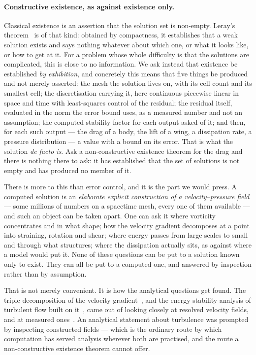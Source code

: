 \documentclass[11pt]{article}
\begin{document}
\paragraph{Constructive existence, as against existence only.} Classical existence is an assertion that the solution set is
non-empty. Leray's theorem~\cite{leray} is of that kind: obtained by compactness, it establishes that
a weak solution exists and says nothing whatever about which one, or what it looks like, or how to
get at it. For a problem whose whole difficulty is that the solutions are complicated, this is close
to no information. We ask instead that existence be established \emph{by exhibition}, and concretely this means that
five things be produced and not merely asserted: the mesh the solution lives on, with its cell count
and its smallest cell; the discretisation carrying it, here continuous piecewise linear in space and
time with least-squares control of the residual; the residual itself, evaluated in the norm the error
bound uses, as a measured number and not an assumption; the computed stability factor for each output
asked of it; and then, for each such output --- the drag of a body, the lift of a wing, a dissipation
rate, a pressure distribution --- a value with a bound on its error. That is what the solution
\emph{de facto is}. Ask a non-constructive existence theorem for the drag and there is nothing there
to ask: it has established that the set of solutions is not empty and has produced no member of it.

There is more to this than error control, and it is the part we would press. A computed solution is an
\emph{elaborate explicit construction of a velocity--pressure field} --- some millions of numbers on a
spacetime mesh, every one of them available --- and such an object can be taken apart. One can ask it
where vorticity concentrates and in what shape; how the velocity gradient decomposes at a point into
straining, rotation and shear; where energy passes from large scales to small and through what
structures; where the dissipation actually sits, as against where a model would put it. None of these
questions can be put to a solution known only to exist. They can all be put to a computed one, and
answered by inspection rather than by assumption.

That is not merely convenient. It is how the analytical questions get found. The triple decomposition
of the velocity gradient~\cite{triple}, and the energy stability analysis of turbulent flow built on
it~\cite{energystab}, came out of looking closely at resolved velocity fields, and at measured
ones~\cite{musci}. An analytical statement about turbulence was prompted by inspecting constructed
fields --- which is the ordinary route by which computation has served analysis wherever both are
practised, and the route a non-constructive existence theorem cannot offer.
\end{document}
